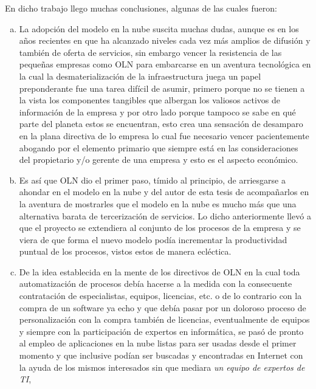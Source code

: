 En dicho trabajo llego muchas conclusiones, algunas de las cuales fueron:
\begin{enumerate}[a.]
    \item La adopción del modelo en la nube suscita muchas dudas, aunque es en
          los años recientes en que ha alcanzado niveles cada vez más amplios
          de difusión y también de oferta de servicios, sin embargo vencer la
          resistencia de las pequeñas empresas como OLN para embarcarse en un
          aventura tecnológica en la cual la desmaterialización de la
          infraestructura juega un papel preponderante fue una tarea difícil
          de asumir, primero porque no se tienen a la vista los componentes
          tangibles que albergan los valiosos activos de información de la
          empresa y por otro lado porque tampoco se sabe en qué parte del
          planeta estos se encuentran, esto crea una sensación de desamparo en
          la plana directiva de lo empresa lo cual fue necesario vencer
          pacientemente abogando por el elemento primario que siempre está en
          las consideraciones del propietario y/o gerente de una empresa y esto
          es el aspecto económico.
    \item Es así que OLN dio el primer paso, tímido al principio, de arriesgarse
          a ahondar en el modelo en la nube y del autor de esta tesis de acompañarlos
          en la aventura de mostrarles que el modelo en la nube es mucho más
          que una alternativa barata de tercerización de servicios. Lo dicho
          anteriormente llevó a que el proyecto se extendiera al conjunto de
          los procesos de la empresa y se viera de que forma el nuevo modelo
          podía incrementar la productividad puntual de los procesos, vistos
          estos de manera ecléctica.
    \item De la idea establecida en la mente de los directivos de OLN en la cual
          toda automatización de procesos debía hacerse a la medida con la
          consecuente contratación de especialistas, equipos, licencias, etc.
          o de lo contrario con la compra de un software ya echo y que debía
          pasar por un doloroso proceso de personalización con la compra también
          de licencias, eventualmente de equipos y siempre con la participación
          de expertos en informática, se pasó de pronto al empleo de aplicaciones
          en la nube listas para ser usadas desde el primer momento y que inclusive
          podían ser buscadas y encontradas en Internet con la ayuda de los
          mismos interesados sin que mediara \emph{un equipo de expertos de TI},

\end{enumerate}
